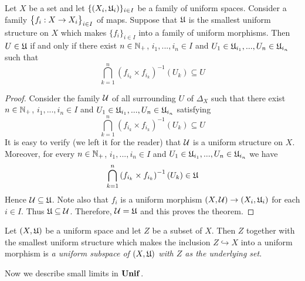 \begin{theorem}\label{theorem:description_of_uniform_structure_introduced_by_a_family_of_maps}
Let $X$ be a set and let $\{(X_i,{\mathfrak U}_i)\}_{i\in I}$ be a family of uniform spaces. Consider a family $\big\{f_i:X\rightarrow X_i\big\}_{i\in I}$ of maps. Suppose that ${\mathfrak U}$ is the smallest uniform structure on $X$ which makes $\{f_i\}_{i\in I}$ into a family of uniform morphisms. Then $U \in {\mathfrak U}$ if and only if there exist $n\in {\mathbb N}_+$, $i_1,...,i_n\in I$ and $U_1 \in {\mathfrak U}_{i_1},...,U_n\in {\mathfrak U}_{i_n}$ such that
$$\bigcap_{k=1}^n\left(f_{i_k}\times f_{i_k}\right)^{-1}(U_k) \subseteq U$$
\end{theorem}
\begin{proof}
Consider the family ${\mathcal U}$ of all surrounding $U$ of $\Delta_X$ such that there exist $n\in {\mathbb N}_+$, $i_1,...,i_n\in I$ and $U_1 \in {\mathfrak U}_{i_1},...,U_n\in {\mathfrak U}_{i_n}$ satisfying
$$\bigcap_{k=1}^n\left(f_{i_k}\times f_{i_k}\right)^{-1}(U_k) \subseteq U$$
It is easy to verify (we left it for the reader) that ${\mathcal U}$ is a uniform structure on $X$. Moreover, for every $n\in {\mathbb N}_+$, $i_1,...,i_n\in I$ and $U_1 \in {\mathfrak U}_{i_1},...,U_n\in {\mathfrak U}_{i_n}$ we have
$$\bigcap_{k=1}^n\left(f_{i_k}\times f_{i_k}\right)^{-1}(U_k) \in {\mathfrak U}$$
Hence ${\mathcal U} \subseteq {\mathfrak U}$. Note also that $f_i$ is a uniform morphism $(X,{\mathcal U})\rightarrow (X_i,{\mathfrak U}_i)$ for each $i\in I$. Thus ${\mathfrak U} \subseteq {\mathcal U}$. Therefore, ${\mathcal U} = {\mathfrak U}$ and this proves the theorem. 
\end{proof}

\begin{definition}
Let $(X,{\mathfrak U})$ be a uniform space and let $Z$ be a subset of $X$. Then $Z$ together with the smallest uniform structure which makes the inclusion $Z\hookrightarrow X$ into a uniform morphism is \textit{a uniform subspace of $(X,{\mathfrak U})$ with $Z$ as the underlying set}.
\end{definition}
\noindent
Now we describe small limits in $\mathbf{Unif}$.

